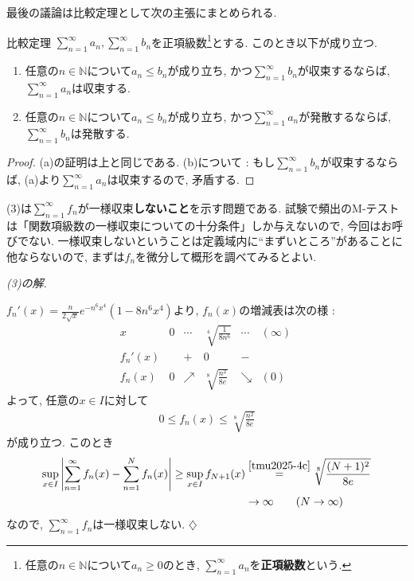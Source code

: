 \documentclass[titlepage]{jsarticle}
\numberwithin{equation}{section}
\newcommand{\N}{\mathbb{N}}%
\newenvironment{kaitou}[1][解]{%
\begin{proofbox}%
\textit{#1. }\ignorespaces
}{%
\hfill$\diamondsuit$%
\end{proofbox}%
}
\begin{document}
最後の議論は比較定理として次の主張にまとめられる.
\begin{thm}{比較定理}{}
$\displaystyle{\sum_{n=1}^\infty a_n} , \displaystyle{\sum_{n=1}^\infty b_n}$を正項級数\footnote{任意の$n \in \N$について$a_n \ge 0$のとき, $\displaystyle{\sum_{n=1}^\infty a_n}$を\textbf{正項級数}という.}とする. このとき以下が成り立つ.
\begin{enumerate}[label=(\alph*)]
\item 任意の$n \in \N$について$a_n \le b_n$が成り立ち, かつ$\displaystyle{\sum_{n=1}^\infty b_n}$が収束するならば, $\displaystyle{\sum_{n=1}^\infty a_n}$は収束する.
\item 任意の$n \in \N$について$a_n \le b_n$が成り立ち, かつ$\displaystyle{\sum_{n=1}^\infty a_n}$が発散するならば, $\displaystyle{\sum_{n=1}^\infty b_n}$は発散する.
\end{enumerate}
\end{thm}
\begin{proof}
(a)の証明は上と同じである. (b)について : もし$\displaystyle{\sum_{n=1}^\infty b_n}$が収束するならば, (a)より$\displaystyle{\sum_{n=1}^\infty a_n}$は収束するので, 矛盾する.
\end{proof}
(3)は$\displaystyle{\sum_{n=1}^{\infty}f_n}$が一様収束\textbf{しないこと}を示す問題である. 試験で頻出のM-テストは「関数項級数の一様収束についての十分条件」しか与えないので, 今回はお呼びでない. 一様収束しないということは定義域内に``まずいところ''があることに他ならないので, まずは$f_n$を微分して概形を調べてみるとよい.
\begin{kaitou}[(3)の解]
$\displaystyle{f_n'(x) = \frac{n}{2\sqrt{x}}e^{-n^6x^4}(1 - 8n^6x^4)}$より, $f_n(x)$の増減表は次の様 : 
\[
\begin{array}{c||c|c|c|c|c}
x
& 0
& \cdots
& \sqrt[4]{\frac{1}{8n^6}}
& \cdots
& (\infty)\ 
\\ \hline
f_n'(x)
&
& +
& 0
& -
&
\\ \hline
f_n(x)
& 0
& \nearrow
& \sqrt[8]{\frac{n^2}{8e}}
& \searrow
& (0)
\end{array}
\]
よって, 任意の$x \in I$に対して
\begin{align}
0 \le f_n(x) \le \sqrt[8]{\frac{n^2}{8e}} \label{tmu2025-4c}
\end{align}
が成り立つ. このとき
\begin{align*}
\sup_{x \in I}\left|\sum_{n=1}^{\infty}f_n(x) - \sum_{n=1}^{N}f_n(x)\right| 
\ge \sup_{x \in I} f_{N+1}(x) &\stackrel{\eqref{tmu2025-4c}}{=} \sqrt[8]{\frac{(N+1)^2}{8e}} \\
&\to \infty \qquad(N \to \infty)
\end{align*}
なので, $\displaystyle{\sum_{n=1}^{\infty}f_n}$は一様収束しない.
\end{kaitou}
\end{document}
